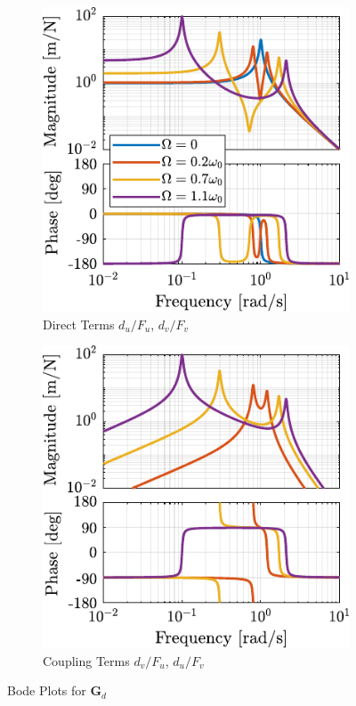 \documentclass{ISMA_USD2020}
\begin{document}
\begin{figure}[htbp]
\begin{subfigure}[c]{0.45\linewidth}
\includegraphics[width=\linewidth]{figs/plant_compare_rotating_speed_direct.pdf}
\caption{\label{fig:plant_compare_rotating_speed_direct} Direct Terms \(d_u/F_u\), \(d_v/F_v\)}
\end{subfigure}
\begin{subfigure}[c]{0.45\linewidth}
\includegraphics[width=\linewidth]{figs/plant_compare_rotating_speed_coupling.pdf}
\caption{\label{fig:plant_compare_rotating_speed_coupling} Coupling Terms \(d_v/F_u\), \(d_u/F_v\)}
\end{subfigure}
\caption{\label{fig:plant_compare_rotating_speed}Bode Plots for \(\bm{G}_d\)}
\centering
\end{figure}
\end{document}
